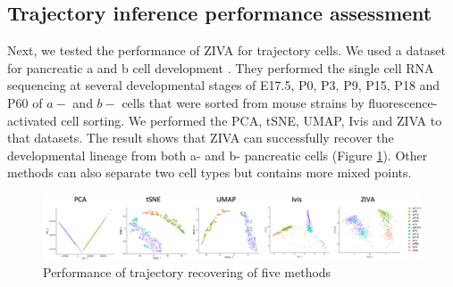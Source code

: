 \subsection{Trajectory inference performance assessment}
Next, we tested the performance of ZIVA for trajectory cells. We used a dataset for pancreatic a and b cell development \cite{qiu2017deciphering}. They performed the single cell RNA sequencing at several developmental stages of E17.5, P0, P3, P9, P15, P18 and P60 of $a-$ and $b-$ cells that were sorted from mouse strains by fluorescence-activated cell sorting. We performed the PCA, tSNE, UMAP, Ivis and ZIVA to that datasets. The result shows that ZIVA can successfully recover the developmental lineage from both a- and b- pancreatic cells (Figure \ref{traj}). Other methods can also separate two cell types but contains more mixed points.  
\begin{figure}[htb!]
    \centering
    \includegraphics[width=1\textwidth]{figures/myfigures/traj.png}
    \caption{Performance of trajectory recovering of five methods}
    \label{traj}
\end{figure}

